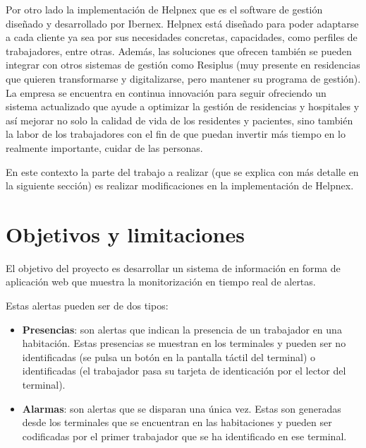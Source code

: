 Por otro lado la implementación de Helpnex que es el software de gestión diseñado y desarrollado por Ibernex. Helpnex está diseñado para poder adaptarse a cada cliente ya sea por sus necesidades concretas, capacidades, como perfiles de trabajadores, entre otras.
Además, las soluciones que ofrecen también se pueden integrar con otros sistemas de gestión como Resiplus (muy presente en residencias que quieren transformarse y digitalizarse, pero mantener su programa de gestión). 
La empresa se encuentra en continua innovación para seguir ofreciendo un sistema actualizado que ayude a optimizar la gestión de residencias y hospitales y así mejorar no solo la calidad de vida de los residentes y pacientes, sino también la labor de los trabajadores con el fin de que puedan invertir más tiempo en lo realmente importante, cuidar de las personas.

En este contexto la parte del trabajo a realizar (que se explica con más detalle en la siguiente sección) es realizar modificaciones en la implementación de Helpnex.



\section{Objetivos y limitaciones}

El objetivo del proyecto es desarrollar un sistema de información en forma de aplicación web que muestra la monitorización en tiempo real de alertas. \newline

Estas alertas pueden ser de dos tipos:
\begin{itemize}
    \item \textbf{Presencias}: son alertas que indican la presencia de un trabajador en una habitación. Estas presencias se muestran en los terminales y pueden ser no identificadas (se pulsa un botón en la pantalla táctil del terminal) o identificadas (el trabajador pasa su tarjeta de identicación por el lector del terminal).
    \item \textbf{Alarmas}: son alertas que se disparan una única vez. Estas son generadas desde los terminales que se encuentran en las habitaciones y pueden ser codificadas por el primer trabajador que se ha identificado en ese terminal.    
\end{itemize}


